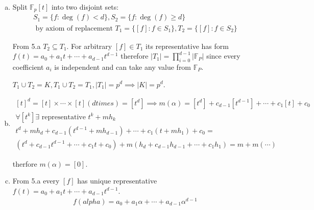 \documentclass[12pt]{article}
\begin{document}
\begin{enumerate}
\begin{enumerate}[a)]
                \[
                \begin{gathered}
                  q_1m + r_1 - (q_2m + r_2) = 0 \\
                  m(q_1 - q_2) + (r_1 - r_2) = 0 \\
                  \deg(m) > \deg(r_1 - r_2), \deg(m) >= 1 \implies q_1 = q_2, r_1 = r_2
                \end{gathered}
                \]
          \item Split $\mathbb{F}_p[t]$ into two disjoint sets:
                \[
                \begin{gathered}
                  S_1 = \{f \colon \deg(f) < d\}, S_2 = \{f \colon \deg(f) \geq d\} \\
                  \text{ by axiom of replacement } T_1 = \{[f] \colon f \in S_1\}, T_2 = \{[f] \colon f \in S_2\}
                \end{gathered}
                \]

                From 5.a $T_2 \subseteq T_1$. For arbitrary $[f] \in T_1$ its representative has form $f(t) = a_0 + a_1t +\cdots +a_{d-1}t^{d-1}$ therefore $|T_1| = \prod_{i=0}^{d-1}|\mathbb{F}_P|$ since every coefficient $a_i$ is independent and can take any value from $\mathbb{F}_P$.

                $T_1 \cup T_2 = K, T_1 \cup T_2 = T_1, |T_1| = p^d \implies |K| = p^d$.
          \item
                \[
                \begin{gathered}
                  {[t]}^{d} = [t] \times \cdots \times [t] (d times) = [t^d] \implies m(\alpha) = [t^{d}] + c_{d-1}[t^{d-1}] + \cdots + c_{1}[t] + c_0 \\
                  \forall [t^k] \exists \text{ representative } t^k + m h_k \\
                  t^d + mh_d + c_{d-1}(t^{d-1} + mh_{d-1}) + \cdots + c_1(t + mh_{1}) + c_0 = \\
                  (t^d + c_{d-1}t^{d-1} + \cdots + c_1t + c_0) + m(h_d + c_{d-1}h_{d-1} + \cdots + c_1h_1) = m + m(\cdots)
                \end{gathered}
                \]

                therfore $m(\alpha) = [0]$.
          \item
                From 5.a every $[f]$ has unique representative $f(t) = a_0 + a_1t + \cdots + a_{d-1}t^{d-1}$.
                \[
                \begin{gathered}
                  f(alpha) = a_0 + a_1 \alpha + \cdots + a_{d-1} {\alpha}^{d-1} \\
                \end{gathered}
                \]


\end{enumerate}
\end{enumerate}
\end{document}
